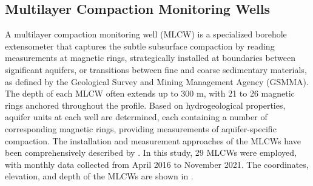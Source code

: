 
\subsection{Multilayer Compaction Monitoring Wells}
\label{subsubsec:mlcw}

A multilayer compaction monitoring well (MLCW) is a specialized borehole extensometer that captures the subtle subsurface compaction by reading measurements at magnetic rings, strategically installed at boundaries between significant aquifers, or transitions between fine and coarse sedimentary materials, as defined by the Geological Survey and Mining Management Agency (GSMMA).  The depth of each MLCW often extends up to 300 m, with 21 to 26 magnetic rings anchored throughout the profile. Based on hydrogeological properties, aquifer units at each well are determined, each containing a number of corresponding magnetic rings, providing measurements of aquifer-specific compaction. The installation and measurement approaches of the MLCWs have been comprehensively described by \citep{hung_measuring_2021}. In this study, 29 MLCWs were employed, with monthly data collected from April 2016 to November 2021.  The coordinates, elevation, and depth of the MLCWs are shown in .


